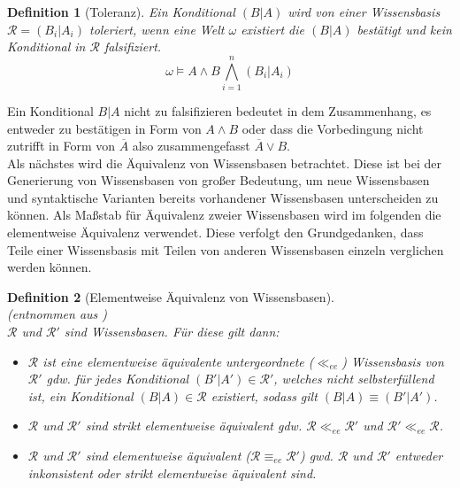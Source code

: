 \documentclass[12pt,a4paper]{article}
\newtheorem{theorem}{Definition}
\begin{document}
\begin{theorem}[Toleranz]
\label{def:toleranz}
Ein Konditional $(B|A)$ wird von einer Wissensbasis $\mathcal{R} = {(B_i|A_i)}$ toleriert, wenn eine Welt $\omega$ existiert die $(B|A)$ bestätigt und kein Konditional in $\mathcal{R}$ falsifiziert.
\begin{equation}
\omega \models A \wedge B \bigwedge^n_{i=1}(B_i|A_i)
\end{equation}
\end{theorem}
Ein Konditional $B|A$ nicht zu falsifizieren bedeutet in dem Zusammenhang, es entweder zu bestätigen in Form von $A \wedge B$ oder dass die Vorbedingung nicht zutrifft in Form von $\overline{A}$ also zusammengefasst $\overline{A} \vee B$. \\
Als nächstes wird die Äquivalenz von Wissensbasen betrachtet. Diese ist bei der Generierung von Wissensbasen von großer Bedeutung, um neue Wissensbasen und syntaktische Varianten bereits vorhandener Wissensbasen unterscheiden zu können. Als Maßstab für Äquivalenz zweier Wissensbasen wird im folgenden die elementweise Äquivalenz verwendet. Diese verfolgt den Grundgedanken, dass Teile einer Wissensbasis mit Teilen von anderen Wissensbasen einzeln verglichen werden können.
\begin{theorem}[Elementweise Äquivalenz von Wissensbasen] \ \\(entnommen aus \cite{beierle17b}) \ \\
$\mathcal{R}$ und $\mathcal{R'}$ sind Wissensbasen. Für diese gilt dann:
\begin{itemize}
\item{$\mathcal{R}$ ist eine elementweise äquivalente untergeordnete ($\ll_{ee}$) Wissensbasis von $\mathcal{R'}$ gdw. für jedes Konditional $(B'|A') \in \mathcal{R'}$, welches nicht selbsterfüllend ist, ein Konditional $(B|A) \in \mathcal{R}$ existiert, sodass gilt $(B|A) \equiv (B'|A')$.}
\item{$\mathcal{R}$ und $\mathcal{R'}$ sind strikt elementweise äquivalent gdw. $\mathcal{R} \ll_{ee} \mathcal{R'}$ und $\mathcal{R}' \ll_{ee}\mathcal{R}$.}
\item{$\mathcal{R}$ und $\mathcal{R'}$ sind elementweise äquivalent ($\mathcal{R} \equiv_{ee} \mathcal{R'}$) gwd. $\mathcal{R}$ und $\mathcal{R'}$ entweder inkonsistent oder strikt elementweise äquivalent sind.}
\end{itemize}
\end{theorem}
\end{document}
